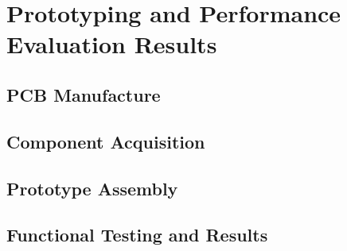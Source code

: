 

\chapter{Prototyping and Performance Evaluation Results}\label{cha:chapter4_PrototypingPerf}

\section{PCB Manufacture}\label{41_PCBmanufacture}

\section{Component Acquisition}\label{42_ComponentAcquisition}

\section{Prototype Assembly}\label{43_PrototypeAssembly}

\section{Functional Testing and Results}\label{44_FunctionalTesting}
